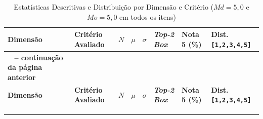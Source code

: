 \noindent
{
\footnotesize 
\renewcommand{\arraystretch}{1.15}
\setlength{\LTleft}{0pt}
\setlength{\LTright}{0pt}

\begin{xltabular}{\textwidth}{|>{\raggedright\arraybackslash}p{2.2cm}|>{\raggedright\arraybackslash}X|c|c|c|>{\centering\arraybackslash}p{1.4cm}|>{\centering\arraybackslash}p{1.5cm}|>{\centering\arraybackslash}p{2.2cm}|}
    \caption{Estatísticas Descritivas e Distribuição por Dimensão e Critério ($Md = 5,0$ e $Mo = 5,0$ em todos os itens)}
    \label{tab:estatisticas_descritivas} \\
    \toprule
    \textbf{Dimensão} & \textbf{Critério Avaliado} & \textbf{$N$} & \textbf{$\mu$} & \textbf{$\sigma$} & \textbf{\textit{Top-2 Box}} & \textbf{Nota 5 (\%)} & \textbf{Dist. \texttt{[1,2,3,4,5]}} \\
    \midrule
    \endfirsthead

    {{\bfseries \tablename\ \thetable{} -- continuação da página anterior}} \\
    \toprule
    \textbf{Dimensão} & \textbf{Critério Avaliado} & \textbf{$N$} & \textbf{$\mu$} & \textbf{$\sigma$} & \textbf{\textit{Top-2 Box}} & \textbf{Nota 5 (\%)} & \textbf{Dist. \texttt{[1,2,3,4,5]}} \\
    \midrule
    \endhead

    \midrule {} \\
    \endfoot

    \bottomrule
     \\
    \endlastfoot
    

\end{xltabular}}

